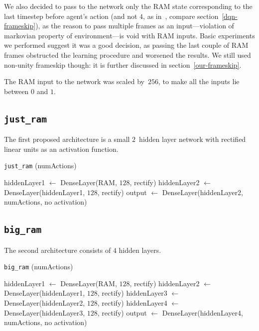 We also decided to pass to the network only the RAM state corresponding to the last timestep before agent's action (and not $4$, as in~\cite{nips-dqn}, compare section~\ref{dqn-frameskip}), as the reason to pass multiple frames as an input---violation of markovian property of environment---is void with RAM inputs.
Basic experiments we performed suggest it was a good decision, as passing the last couple of RAM frames obstructed the learning procedure and worsened the results.
We still used non-unity frameskip though: it is further discussed in section~\ref{our-frameskip}.

The RAM input to the network was scaled by~$256$, to make all the inputs lie between $0$ and $1$.

\subsection{\texttt{just\_ram}}
The first proposed architecture is a small $2$~hidden layer network with rectified linear units as an activation function.

\begin{algorithm}[H]
\DontPrintSemicolon
\AlFnt{\small\sf}
\caption{\texttt{just\_ram} (numActions)}
\SetAlgoVlined

\AlFnt{\small\sf}
\vspace{0.05cm}
hiddenLayer1 $\leftarrow$ DenseLayer(RAM, $128$, rectify)\;
hiddenLayer2 $\leftarrow$ DenseLayer(hiddenLayer1, $128$, rectify)\;
output $\leftarrow$ DenseLayer(hiddenLayer2, numActions, no activation)\;

\end{algorithm}
\subsection{\texttt{big\_ram}}
The second architecture consists of $4$ hidden layers.


\begin{algorithm}[H]
\DontPrintSemicolon
\AlFnt{\small\sf}
\caption{\texttt{big\_ram} (numActions)}

\SetAlgoVlined

\vspace{0.05cm}

hiddenLayer1 $\leftarrow$ DenseLayer(RAM, $128$, rectify)\;
hiddenLayer2 $\leftarrow$ DenseLayer(hiddenLayer1, $128$, rectify)\;
hiddenLayer3 $\leftarrow$ DenseLayer(hiddenLayer2, $128$, rectify)\;
hiddenLayer4 $\leftarrow$ DenseLayer(hiddenLayer3, $128$, rectify)\;
output $\leftarrow$ DenseLayer(hiddenLayer4, numActions, no activation)\;

\end{algorithm}

